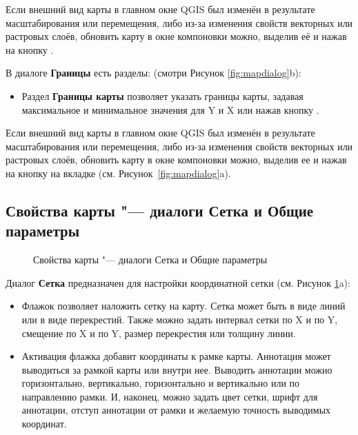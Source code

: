 Если внешний вид карты в главном окне QGIS был изменён в результате
масштабирования или перемещения, либо из-за изменения свойств векторных
или растровых слоёв, обновить карту в окне компоновки можно, выделив её
и нажав на кнопку .


В диалоге \textbf{Границы} есть разделы:
(смотри Рисунок \ref{fig:mapdialog}b):

\begin{itemize}[label=--]
\item Раздел \textbf{Границы карты} позволяет указать границы карты,
задавая максимальное и минимальное значения для Y и X или нажав кнопку
.
\end{itemize}

Если внешний вид карты в главном окне QGIS был изменён в результате
масштабирования или перемещения, либо из-за изменения свойств векторных
или растровых слоёв, обновить карту в окне компоновки можно, выделив ее
и нажав на кнопку  на вкладке  (см.
Рисунок~\ref{fig:mapdialog}a).

\subsection{Свойства карты "--- диалоги Сетка и Общие параметры}

\begin{figure}[ht]
\centering
   \hspace{1cm}
   \caption{Свойства карты "--- диалоги Сетка и Общие параметры \wincaption}\label{fig:sec_map_dialog}
\end{figure}


Диалог \textbf{Сетка} предназначен для настройки координатной сетки
(см. Рисунок \ref{fig:sec_map_dialog}a):

\begin{itemize}[label=--]
\item Флажок  позволяет наложить сетку на
карту. Сетка может быть в виде линий или в виде перекрестий. Также
можно задать интервал сетки по X и по Y, смещение по X и по Y, размер
перекрестия или толщину линии.
\item Активация флажка  добавит
координаты к рамке карты. Аннотация может выводиться за рамкой карты или
внутри нее. Выводить аннотации можно горизонтально, вертикально,
горизонтально и вертикально или по направлению рамки. И, наконец, можно
задать цвет сетки, шрифт для аннотации, отступ аннотации от рамки и
желаемую точность выводимых координат.
\end{itemize}

